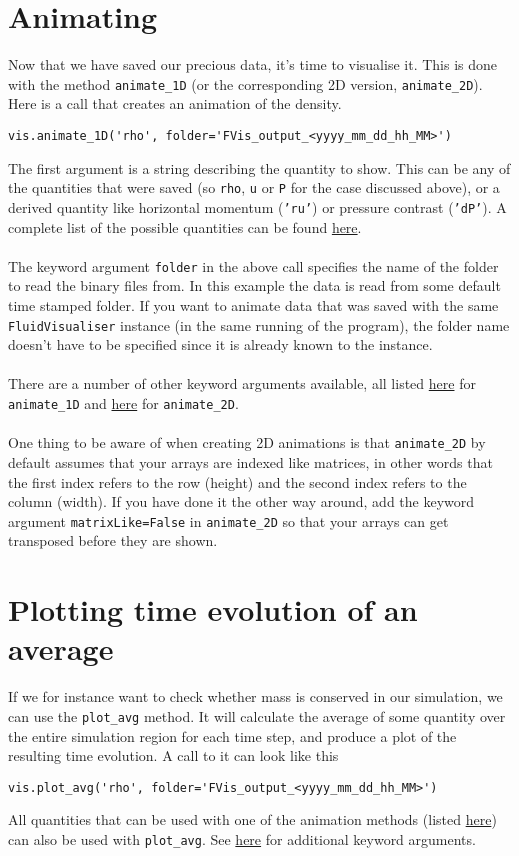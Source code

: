 \documentclass{article}
\newcommand{\ttt}[1]{\texttt{#1}}
\begin{document}
\section{Animating}
\label{sec:anim}
Now that we have saved our precious data, it's time to visualise it. This is done with the method \ttt{animate\_1D} (or the corresponding 2D version, \ttt{animate\_2D}). Here is a call that creates an animation of the density.
\begin{lstlisting}
vis.animate_1D('rho', folder='FVis_output_<yyyy_mm_dd_hh_MM>')
\end{lstlisting}
The first argument is a string describing the quantity to show. This can be any of the quantities that were saved (so \ttt{rho}, \ttt{u} or \ttt{P} for the case discussed above), or a derived quantity like horizontal momentum (\ttt{'ru'}) or pressure contrast (\ttt{'dP'}). A complete list of the possible quantities can be found \hyperref[sec:quants]{here}.\\\\
The keyword argument \ttt{folder} in the above call specifies the name of the folder to read the binary files from. In this example the data is read from some default time stamped folder. If you want to animate data that was saved with the same \ttt{FluidVisualiser} instance (in the same running of the program), the folder name doesn't have to be specified since it is already known to the instance.\\\\
There are a number of other keyword arguments available, all listed \hyperref[sec:anim1]{here} for \ttt{animate\_1D} and \hyperref[sec:anim2]{here} for \ttt{animate\_2D}.\\\\
One thing to be aware of when creating 2D animations is that \ttt{animate\_2D} by default assumes that your arrays are indexed like matrices, in other words that the first index refers to the row (height) and the second index refers to the column (width). If you have done it the other way around, add the keyword argument \ttt{matrixLike=False} in \ttt{animate\_2D} so that your arrays can get transposed before they are shown.

\section{Plotting time evolution of an average}
\label{sec:plot}
If we for instance want to check whether mass is conserved in our simulation, we can use the \ttt{plot\_avg} method. It will calculate the average of some quantity over the entire simulation region for each time step, and produce a plot of the resulting time evolution. A call to it can look like this
\begin{lstlisting}
vis.plot_avg('rho', folder='FVis_output_<yyyy_mm_dd_hh_MM>')
\end{lstlisting}
All quantities that can be used with one of the animation methods (listed \hyperref[sec:quants]{here}) can also be used with \ttt{plot\_avg}. See \hyperref[sec:pa]{here} for additional keyword arguments.
\end{document}
